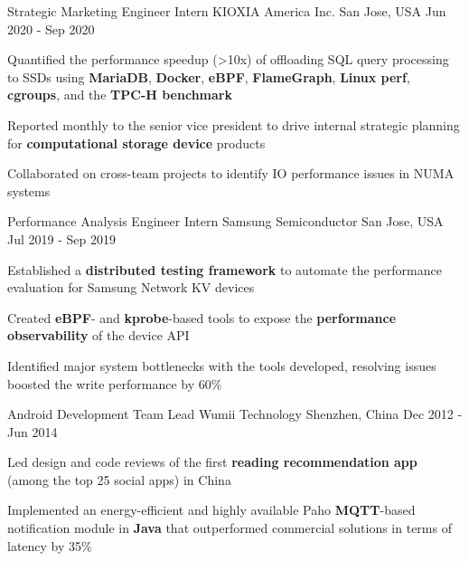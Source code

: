 \begin{cventries}
  \cventry
    {Strategic Marketing Engineer Intern} %
    {KIOXIA America Inc.} %
    {San Jose, USA} %
    {Jun 2020 - Sep 2020} %
    {
      \begin{cvitems} %
        \item {Quantified the performance speedup (\textgreater 10x) of offloading SQL query processing to SSDs using \textbf{MariaDB}, \textbf{Docker}, \textbf{eBPF}, \textbf{FlameGraph}, \textbf{Linux perf}, \textbf{cgroups}, and the \textbf{TPC-H benchmark}}
        \item {Reported monthly to the senior vice president to drive internal strategic planning for \textbf{computational storage device} products}
        \item {Collaborated on cross-team projects to identify IO performance issues in NUMA systems}
      \end{cvitems}
    }

  \cventry
    {Performance Analysis Engineer Intern} %
    {Samsung Semiconductor} %
    {San Jose, USA} %
    {Jul 2019 - Sep 2019} %
    {
      \begin{cvitems} %
        \item {Established a \textbf{distributed testing framework} to automate the performance evaluation for Samsung Network KV devices}
        \item {Created \textbf{eBPF}- and \textbf{kprobe}-based tools to expose the \textbf{performance observability} of the device API}
        \item {Identified major system bottlenecks with the tools developed, resolving issues boosted the write performance by 60\%}
      \end{cvitems}
    }

  \cventry
    {Android Development Team Lead} %
    {Wumii Technology} %
    {Shenzhen, China} %
    {Dec 2012 - Jun 2014} %
    {
      \begin{cvitems} %
        \item {Led design and code reviews of the first \textbf{reading recommendation app} (among the top 25 social apps) in China}
        \item {Implemented an energy-efficient and highly available Paho \textbf{MQTT}-based notification module in \textbf{Java} that outperformed commercial solutions in terms of latency by 35\%}
      \end{cvitems}
    }


\end{cventries}

